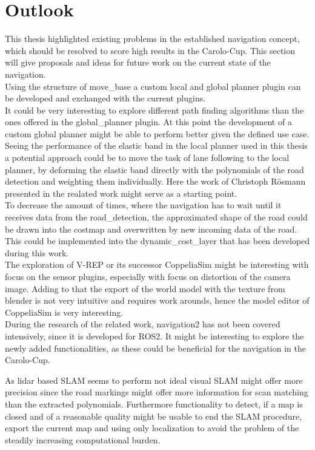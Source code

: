 \chapter{Outlook}
\label{outlook}

This thesis highlighted existing problems in the established navigation concept, which should be resolved to score high results in the Carolo-Cup. This section will give proposals and ideas for future work on the current state of the navigation.\\

Using the structure of move\_base a custom local and global planner plugin can be developed and exchanged with the current plugins.\\

It could be very interesting to explore different path finding algorithms than the ones offered in the global\_planner plugin. At this point the development of a custom global planner might be able to perform better given the defined use case.\\

Seeing the performance of the elastic band in the local planner used in this thesis a potential approach could be to move the task of lane following to the local planner, by deforming the elastic band directly with the polynomials of the road detection and weighting them individually. Here the work of Christoph Rösmann presented in the realated work might serve as a starting point.\\

To decrease the amount of times, where the navigation has to wait until it receives data from the road\_detection, the approximated shape of the road could be drawn into the costmap and overwritten by new incoming data of the road. This could be implemented into the dynamic\_cost\_layer that has been developed during this work.\\

The exploration of V-REP or its successor CoppeliaSim might be interesting with focus on the sensor plugins, especially with focus on distortion of the camera image. Adding to that the export of the world model with the texture from blender is not very intuitive and requires work arounds, hence the model editor of CoppeliaSim is very interesting. \\

During the research of the related work, navigation2 has not been covered intensively, since it is developed for ROS2. It might be interesting to explore the newly added functionalities, as these could be beneficial for the navigation in the Carolo-Cup.

As lidar based SLAM seems to perform not ideal visual SLAM might offer more precision since the road markings might offer more information for scan matching than the extracted polynomials. Furthermore functionality to detect, if a map is closed and of a reasonable quality might be usable to end the SLAM procedure, export the current map and using only localization to avoid the problem of the steadily increasing computational burden.